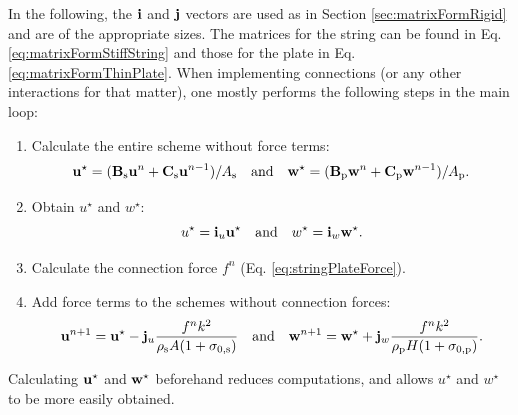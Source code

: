 In the following, the $\mathbf{i}$ and $\mathbf{j}$ vectors are used as in Section \ref{sec:matrixFormRigid} and are of the appropriate sizes. The matrices for the string can be found in Eq. \eqref{eq:matrixFormStiffString} and those for the plate in Eq. \eqref{eq:matrixFormThinPlate}. When implementing connections (or any other interactions for that matter), one mostly performs the following steps in the main loop:
\begin{enumerate}
    \item Calculate the entire scheme without force terms:\\
    \vspace{-0.5em}\begin{equation*}
        \mathbf{u}^\star = (\mathbf{B}_{\text{s}}\mathbf{u}^n + \mathbf{C}_{\text{s}}\mathbf{u}^{n-1}) / A_{\text{s}} \quad \text{and} \quad \mathbf{w}^\star = (\mathbf{B}_{\text{p}}\mathbf{w}^n + \mathbf{C}_{\text{p}}\mathbf{w}^{n-1})/A_{\text{p}}.
    \end{equation*}
    \item Obtain $u^\star$ and $w^\star$:\\
    \vspace{-1em}\begin{equation*}
       u^\star = \mathbf{i}_u \mathbf{u}^\star \quad \text{and} \quad w^\star = \mathbf{i}_w \mathbf{w}^\star.
    \end{equation*}
    \item Calculate the connection force $f^n$ (Eq. \eqref{eq:stringPlateForce}).
    \item Add force terms to the schemes without connection forces:\\
    \begin{equation*}
        \u^{n+1} = \u^{\star} - \j_u \frac{f^n k^2}{\rho_\stxt A (1+\szX[\stxt])}\qaq \w^{n+1} = \w^{\star} + \j_w \frac{f^n k^2}{\rho_\ptxt H (1+\szX[\ptxt])}.
    \end{equation*} 
\end{enumerate}
Calculating $\mathbf{u}^\star$ and $\mathbf{w}^\star$ beforehand reduces computations, and allows $u^\star$ and $w^\star$ to be more easily obtained. 

